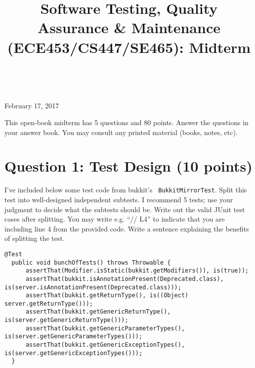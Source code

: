 \documentclass[12pt]{article}
\begin{document}
\title{Software Testing, Quality Assurance \& Maintenance (ECE453/CS447/SE465): Midterm}
\author{}
\renewcommand{\today}{}
\maketitle

 ~\\[-7em]

\begin{center}
{\Large February 17, 2017}
\end{center}

This open-book midterm has 5 questions and 80 points. Answer the
questions in your answer book. You may consult any printed material
(books, notes, etc).


\section*{Question 1: Test Design (10 points)}
I've included below some test code from bukkit's {\tt
  BukkitMirrorTest}.  Split this test into well-designed independent
subtests. I recommend 5 tests; use your judgment to decide what the
subtests should be. Write out the valid JUnit test cases after
splitting. You may write e.g. ``// L4'' to indicate that you are
including line 4 from the provided code. Write a sentence explaining
the benefits of splitting the test.

\begin{lstlisting}[basicstyle=\scriptsize \ttfamily]
  @Test
  public void bunchOfTests() throws Throwable {
      assertThat(Modifier.isStatic(bukkit.getModifiers()), is(true));
      assertThat(bukkit.isAnnotationPresent(Deprecated.class), is(server.isAnnotationPresent(Deprecated.class)));
      assertThat(bukkit.getReturnType(), is((Object) server.getReturnType()));
      assertThat(bukkit.getGenericReturnType(), is(server.getGenericReturnType()));
      assertThat(bukkit.getGenericParameterTypes(), is(server.getGenericParameterTypes()));
      assertThat(bukkit.getGenericExceptionTypes(), is(server.getGenericExceptionTypes()));
  }
\end{lstlisting}

\vspace*{-1em}
\end{document}
